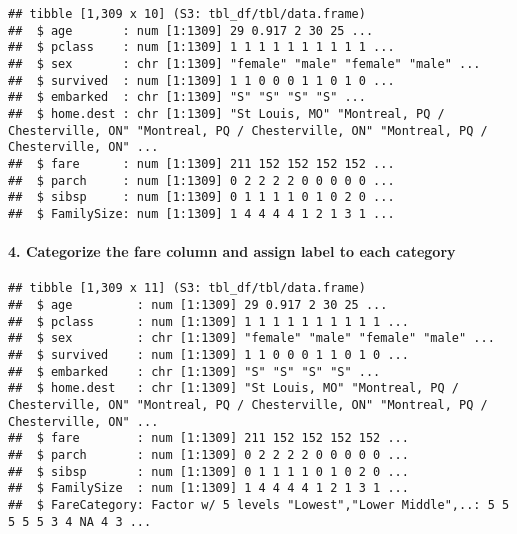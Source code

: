 \documentclass[
]{article}
\newenvironment{Shaded}{\begin{snugshade}}{\end{snugshade}}
\newcommand{\AttributeTok}[1]{\textcolor[rgb]{0.13,0.29,0.53}{#1}}
\newcommand{\ConstantTok}[1]{\textcolor[rgb]{0.56,0.35,0.01}{#1}}
\newcommand{\DecValTok}[1]{\textcolor[rgb]{0.00,0.00,0.81}{#1}}
\newcommand{\FunctionTok}[1]{\textcolor[rgb]{0.13,0.29,0.53}{\textbf{#1}}}
\newcommand{\NormalTok}[1]{#1}
\newcommand{\OtherTok}[1]{\textcolor[rgb]{0.56,0.35,0.01}{#1}}
\newcommand{\SpecialCharTok}[1]{\textcolor[rgb]{0.81,0.36,0.00}{\textbf{#1}}}
\newcommand{\StringTok}[1]{\textcolor[rgb]{0.31,0.60,0.02}{#1}}
\begin{document}
\begin{verbatim}
## tibble [1,309 x 10] (S3: tbl_df/tbl/data.frame)
##  $ age       : num [1:1309] 29 0.917 2 30 25 ...
##  $ pclass    : num [1:1309] 1 1 1 1 1 1 1 1 1 1 ...
##  $ sex       : chr [1:1309] "female" "male" "female" "male" ...
##  $ survived  : num [1:1309] 1 1 0 0 0 1 1 0 1 0 ...
##  $ embarked  : chr [1:1309] "S" "S" "S" "S" ...
##  $ home.dest : chr [1:1309] "St Louis, MO" "Montreal, PQ / Chesterville, ON" "Montreal, PQ / Chesterville, ON" "Montreal, PQ / Chesterville, ON" ...
##  $ fare      : num [1:1309] 211 152 152 152 152 ...
##  $ parch     : num [1:1309] 0 2 2 2 2 0 0 0 0 0 ...
##  $ sibsp     : num [1:1309] 0 1 1 1 1 0 1 0 2 0 ...
##  $ FamilySize: num [1:1309] 1 4 4 4 4 1 2 1 3 1 ...
\end{verbatim}

\paragraph{4. Categorize the fare column and assign label to each
category}\label{categorize-the-fare-column-and-assign-label-to-each-category}

\begin{Shaded}
\end{Shaded}

\begin{verbatim}
## tibble [1,309 x 11] (S3: tbl_df/tbl/data.frame)
##  $ age         : num [1:1309] 29 0.917 2 30 25 ...
##  $ pclass      : num [1:1309] 1 1 1 1 1 1 1 1 1 1 ...
##  $ sex         : chr [1:1309] "female" "male" "female" "male" ...
##  $ survived    : num [1:1309] 1 1 0 0 0 1 1 0 1 0 ...
##  $ embarked    : chr [1:1309] "S" "S" "S" "S" ...
##  $ home.dest   : chr [1:1309] "St Louis, MO" "Montreal, PQ / Chesterville, ON" "Montreal, PQ / Chesterville, ON" "Montreal, PQ / Chesterville, ON" ...
##  $ fare        : num [1:1309] 211 152 152 152 152 ...
##  $ parch       : num [1:1309] 0 2 2 2 2 0 0 0 0 0 ...
##  $ sibsp       : num [1:1309] 0 1 1 1 1 0 1 0 2 0 ...
##  $ FamilySize  : num [1:1309] 1 4 4 4 4 1 2 1 3 1 ...
##  $ FareCategory: Factor w/ 5 levels "Lowest","Lower Middle",..: 5 5 5 5 5 3 4 NA 4 3 ...
\end{verbatim}
\end{document}
